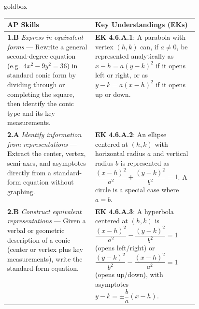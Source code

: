 \documentclass[10pt]{article}
\begin{document}
\begin{skillbox}{goldbox}
\begin{tabularx}{\linewidth}{@{} p{0.46\linewidth} X @{}}
\textbf{AP Skills} & \textbf{Key Understandings (EKs)} \\
\midrule
\textbf{1.B} \textit{Express in equivalent forms} ---
  Rewrite a general second-degree equation (e.g.\ $4x^2 - 9y^2 = 36$) in
  standard conic form by dividing through or completing the square, then
  identify the conic type and its key measurements.
&
\textbf{EK 4.6.A.1}: A parabola with vertex $(h,k)$ can, if $a \ne 0$, be
represented analytically as $x - h = a(y - k)^2$ if it opens left or right,
or as $y - k = a(x - h)^2$ if it opens up or down. \\[4pt]

\textbf{2.A} \textit{Identify information from representations} ---
  Extract the center, vertex, semi-axes, and asymptotes directly from a
  standard-form equation without graphing.
&
\textbf{EK 4.6.A.2}: An ellipse centered at $(h,k)$ with horizontal radius $a$
and vertical radius $b$ is represented as
$\dfrac{(x-h)^2}{a^2} + \dfrac{(y-k)^2}{b^2} = 1$.
A circle is a special case where $a = b$. \\[4pt]

\textbf{2.B} \textit{Construct equivalent representations} ---
  Given a verbal or geometric description of a conic (center or vertex plus key
  measurements), write the standard-form equation.
&
\textbf{EK 4.6.A.3}: A hyperbola centered at $(h,k)$ is
$\dfrac{(x-h)^2}{a^2} - \dfrac{(y-k)^2}{b^2} = 1$ (opens left/right)
or $\dfrac{(y-k)^2}{b^2} - \dfrac{(x-h)^2}{a^2} = 1$ (opens up/down),
with asymptotes $y - k = \pm\dfrac{b}{a}(x - h)$. \\
\end{tabularx}
\end{skillbox}

\vspace{0.08in}
\end{document}
